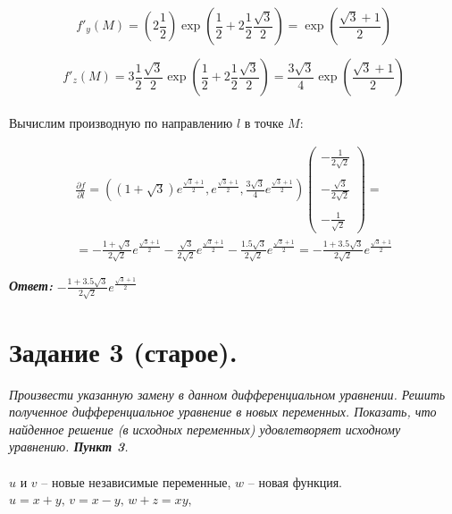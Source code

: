\documentclass[a5paper, 10pt]{article}
\theoremstyle{definition}
\theoremstyle{plain}
\theoremstyle{remark}
\begin{document}
\begin{equation}
f'_y  \left( M \right) =  \left( 2\frac{1}{2}  \right) \exp \left(\frac{1}{2} + 2\frac{1}{2}\frac{\sqrt{3}}{2} \right) =
\exp \left(\frac{\sqrt{3} + 1}{2} \right)
\end{equation}

\begin{equation}
f'_z  \left( M \right) = 3\frac{1}{2}\frac{\sqrt{3}}{2} \exp \left(\frac{1}{2} + 2\frac{1}{2}\frac{\sqrt{3}}{2} \right) =
\frac{3 \sqrt{3}}{4} \exp \left(\frac{\sqrt{3} + 1}{2} \right)
\end{equation}
\\
Вычислим производную по направлению $l$ в точке $M$:

\begin{multline}
\frac{\partial f}{\partial l} = \left(\left(1 + \sqrt{3} \right) e^{ \frac{\sqrt{3} + 1}{2}} , e^{ \frac{\sqrt{3} + 1}{2}}, \frac{3 \sqrt{3}}{4} e^{ \frac{\sqrt{3} + 1}{2}  } \right)
\begin{pmatrix}
 -\frac{1}{2\sqrt{2}}\\
\\
- \frac{\sqrt{3}}{2\sqrt{2}}\\
\\
- \frac{1}{\sqrt{2}}
\end{pmatrix}
= \\
=   -\frac{1 + \sqrt{3}}{2\sqrt{2}} e^{ \frac{\sqrt{3} + 1}{2}} - \frac{\sqrt{3}}{2\sqrt{2}}  e^{ \frac{\sqrt{3} + 1}{2}}
 - \frac{1.5 \sqrt{3}}{2\sqrt{2}}  e^{ \frac{\sqrt{3} + 1}{2}}  =  - \frac{1 + 3.5 \sqrt{3}}{2\sqrt{2}}  e^{ \frac{\sqrt{3} + 1}{2}} 
\end{multline}

\textit{\textbf{Ответ:}} $ - \frac{1 + 3.5 \sqrt{3}}{2\sqrt{2}}  e^{ \frac{\sqrt{3} + 1}{2}} $





\newpage

\section{Задание 3 (старое).}
\textit{Произвести указанную замену в данном дифференциальном уравнении. Решить полученное дифференциальное уравнение в новых переменных. Показать, что найденное решение (в исходных переменных) удовлетворяет исходному уравнению. \textbf{Пункт 3}.}\\
\\
$u$ и $v$ -- новые независимые переменные, $w$ -- новая функция. $u=x+y, \, v = x - y, \, w+z = xy,$
\end{document}
